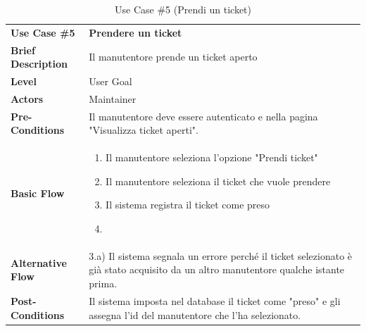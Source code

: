 \documentclass[a4paper, 11pt]{article}
\begin{document}
	\begin{table}[h]
		\centering
		\setlength{\arrayrulewidth}{0.8pt} %

		\begin{tabular}{|l p{12cm}|}
			\hline

			\rowcolor{gray!25}
			\textbf{Use Case \#5} & \textbf{Prendere un ticket} \\
			\textbf{Brief Description} & Il manutentore prende un ticket aperto\\
			\textbf{Level} & User Goal \\
			\textbf{Actors} & Maintainer \\
			\textbf{Pre-Conditions} & Il manutentore deve essere autenticato e nella pagina "Visualizza ticket aperti".\\
			\textbf{Basic Flow} & \begin{enumerate}[label=\arabic*), leftmargin=*, before=\vspace{-0.7cm}, after=\vspace{-0.4cm}]
									  \item Il manutentore seleziona l'opzione "Prendi ticket"
									  \item Il manutentore seleziona il ticket che vuole prendere
									  \item Il sistema registra il ticket come preso
									  \item[]
			\end{enumerate} \\
			\textbf{Alternative Flow} & 3.a) Il sistema segnala un errore perché il ticket selezionato è già stato acquisito da un altro manutentore qualche istante prima.\\
			\textbf{Post-Conditions} & Il sistema imposta nel database il ticket come "preso" e gli assegna l'id del manutentore che l'ha selezionato. \\

			\hline
		\end{tabular}

		\vspace{0.2cm}
		\caption{Use Case \#5 (Prendi un ticket)}
	\end{table}
\end{document}
